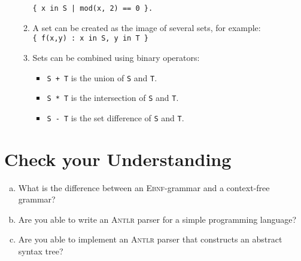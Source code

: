 \begin{enumerate}[(a)]
\begin{enumerate}[1.]
            \hspace*{1.3cm}
            \texttt{\{ x in S | mod(x, 2) == 0 \}.}
      \item A set can be created as the image of several sets, for example:
            \\[0.2cm]
            \hspace*{1.3cm}
            \texttt{\{ f(x,y) : x in S, y in T \}}
      \item Sets can be combined using binary operators:
            \begin{itemize}
            \item \texttt{S + T} is the union of \texttt{S} and \texttt{T}.
            \item \texttt{S * T} is the intersection of \texttt{S} and \texttt{T}.
            \item \texttt{S - T} is the set difference of \texttt{S} and \texttt{T}.
                  \eox
            \end{itemize}
      \end{enumerate}
\end{enumerate}

\section{Check your Understanding}
\begin{enumerate}[(a)]
\item What is the difference between an \textsc{Ebnf}-grammar and a context-free grammar?
\item Are you able to write an \textsc{Antlr} parser for a simple programming language?
\item Are you able to implement an \textsc{Antlr} parser that constructs an abstract syntax tree? 
\end{enumerate}

